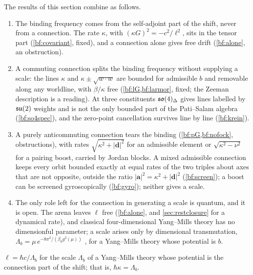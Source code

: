 The results of this section combine as follows.
\begin{enumerate}[label=(\alph*),leftmargin=2.2em]
\item The binding frequency comes from the self-adjoint part of the shift, never from a connection. The rate $\kappa$, with
$(\kappa G)^2=-c^2/\ell^2$, sits in the tensor part (\cref{bf:covariant}, fixed), and a connection alone gives free drift (\cref{bf:alone}, an
obstruction).
\item A commuting connection splits the binding frequency without supplying a scale: the lines $\kappa$ and $\kappa\pm\sqrt{w\cdot w}$ are bounded for
admissible $b$ and removable along any worldline, with $\beta/\kappa$ free (\cref{bf:lG,bf:larmor}, fixed; the Zeeman description is a reading). At
three constituents $\mathfrak{so}(4)_\Delta$ gives lines labelled by $\mathfrak{su}(2)$ weights and is not the only bounded part of the Pati--Salam algebra
(\cref{bf:so4spec}), and the zero-point cancellation survives line by line (\cref{bf:krein}).
\item A purely anticommuting connection tears the binding (\cref{bf:pG,bf:nofock}, obstructions), with rates $\sqrt{\kappa^2+|\mathbf d|^2}$ for an
admissible element or $\sqrt{\kappa^2-\nu^2}$ for a pairing boost, carried by Jordan blocks. A mixed admissible connection keeps every orbit bounded
exactly at equal rates of the two triples about axes that are not opposite, outside the ratio $|\mathbf a|^2=\kappa^2+|\mathbf d|^2$
(\cref{bf:screen}); a boost can be screened gyroscopically (\cref{bf:gyro}); neither gives a scale.
\item The only role left for the connection in generating a scale is quantum, and it is open. The arena leaves $\ell$ free (\cref{bf:alone}, and
\cref{sec:restclosure} for a dynamical rate), and classical four-dimensional Yang--Mills theory has no dimensionful parameter; a scale arises only
by dimensional transmutation, $\Lambda_b=\mu\,e^{-8\pi^2/(\beta_0g^2(\mu))}$ \cite{ColemanWeinberg73,GrossWilczek73}, for a Yang--Mills theory whose
potential is $b$.
\end{enumerate}

\begin{conjecture}
\label{bf:transmute}
$\ell=\hbar c/\Lambda_b$ for the scale $\Lambda_b$ of a Yang--Mills theory whose potential is the connection part of the shift; that is,
$\hbar\kappa=\Lambda_b$.
\end{conjecture}

